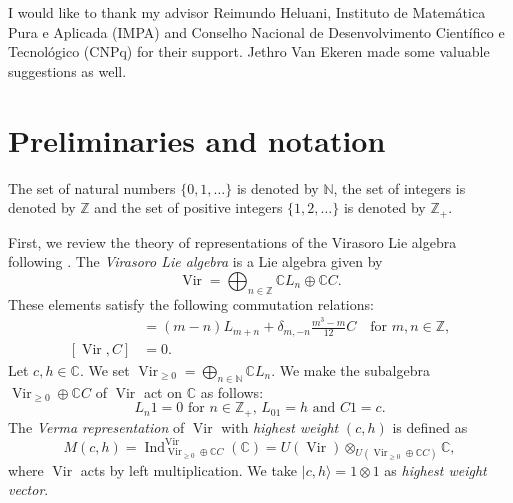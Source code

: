 \documentclass[a4paper, 12pt, reqno]{amsart}
\theoremstyle{remark}
\DeclareMathOperator{\Vir}{Vir}
\DeclareMathOperator{\Ind}{Ind}
\begin{document}
I would like to thank my advisor Reimundo Heluani, Instituto de Matemática Pura e Aplicada (IMPA) and Conselho Nacional de Desenvolvimento Científico e Tecnológico (CNPq) for their support.
Jethro Van Ekeren made some valuable suggestions as well.

\section{Preliminaries and notation}
\label{sec:prel-notat}

The set of natural numbers $\{0, 1, \dots\}$ is denoted by $\mathbb{N}$, the set of integers is denoted by $\mathbb{Z}$ and the set of positive integers $\{1, 2, \dots\}$ is denoted by $\mathbb{Z}_+$.

First, we review the theory of representations of the Virasoro Lie algebra following \cite{kac_bombay_2013}.
The \emph{Virasoro Lie algebra} is a Lie algebra given by
\begin{equation*}
  \Vir = \bigoplus_{n \in \mathbb{Z}}\mathbb{C}L_n \oplus \mathbb{C}C.
\end{equation*}
These elements satisfy the following commutation relations:
\begin{align*}
  [L_m, L_n] &= (m - n)L_{m + n} + \delta_{m, -n}\frac{m^3 - m}{12}C \quad \text{for $m, n \in \mathbb{Z}$}, \\
  [\Vir, C] &= 0.
\end{align*}
Let $c, h \in \mathbb{C}$.
We set $\Vir_{\ge 0} = \bigoplus_{n \in \mathbb{N}}\mathbb{C}L_n$.
We make the subalgebra $\Vir_{\ge 0} \oplus \mathbb{C}C$ of $\Vir$ act on $\mathbb{C}$ as follows:
\begin{equation*}
  \text{$L_n1 = 0$ for $n \in \mathbb{Z}_+$, $L_01 = h$ and $C1 = c$}.
\end{equation*}
The \emph{Verma representation} of $\Vir$ with \emph{highest weight} $(c, h)$ is defined as
\begin{equation*}
  M(c, h) = \Ind^{\Vir}_{\Vir_{\ge 0} \oplus \mathbb{C}C}(\mathbb{C}) = U(\Vir) \otimes_{U(\Vir_{\ge 0} \oplus \mathbb{C}C)} \mathbb{C},
\end{equation*}
where $\Vir$ acts by left multiplication.
We take $|c, h\rangle = 1 \otimes 1$ as \emph{highest weight vector}.
\end{document}
